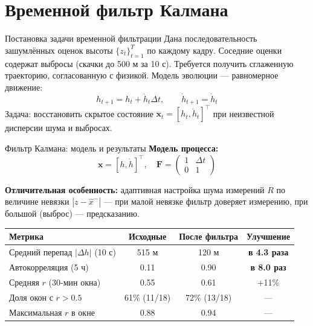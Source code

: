 \documentclass[11pt,aspectratio=169]{beamer}
\begin{document}

\section{Временной фильтр Калмана}

\begin{frame}{Постановка задачи временной фильтрации}
Дана последовательность зашумлённых оценок высоты $\{z_t\}_{t=1}^T$ по каждому кадру. Соседние оценки содержат выбросы (скачки до 500 м за 10 с). Требуется получить сглаженную траекторию, согласованную с физикой. Модель эволюции --- равномерное движение:
\[
	h_{t+1} = h_t + \dot{h}_t \Delta t, \qquad \dot{h}_{t+1} = \dot{h}_t
\]
Задача: восстановить скрытое состояние $\mathbf{x}_t = [h_t, \dot{h}_t]^\top$ при неизвестной дисперсии шума и выбросах.
\end{frame}

\begin{frame}{Фильтр Калмана: модель и результаты}
\textbf{Модель процесса:}
\[
	\mathbf{x} = [h, \dot{h}]^\top, \quad
	\mathbf{F} = \begin{pmatrix} 1 & \Delta t \\ 0 & 1 \end{pmatrix}
\]

\textbf{Отличительная особенность:} адаптивная настройка шума измерений $R$ по величине невязки $|z - \hat{x}^-|$ --- при малой невязке фильтр доверяет измерению, при большой (выброс) --- предсказанию.

\vspace{2mm}
\begin{table}
\centering
\begin{tabular}{lccc}
\toprule
Метрика & Исходные & После фильтра & Улучшение \\
\midrule
Средний перепад $|\Delta h|$ (10 с) & 515 м & 120 м & \textbf{в 4.3 раза} \\
Автокорреляция (5 ч) & 0.11 & 0.90 & \textbf{в 8.0 раз} \\
Средняя $r$ (30-мин окна) & 0.55 & 0.61 & +11\% \\
Доля окон с $r > 0.5$ & 61\% (11/18) & 72\% (13/18) & --- \\
Максимальная $r$ в окне & 0.88 & 0.94 & --- \\
\bottomrule
\end{tabular}
\end{table}
\end{frame}
\end{document}
